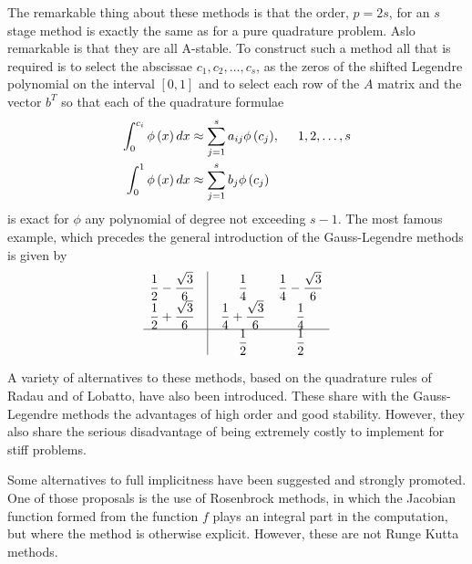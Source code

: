 \documentclass[a4paper,oneside]{book}
\numberwithin{equation}{chapter}
\begin{document}
The remarkable thing about these methods is that the order, $p=2s$, for an $s$ stage method is exactly the same as for a pure quadrature problem. Aslo remarkable is that they are all A-stable. To construct such a method all that is required is to select the abscissae $c_1,c_2,\ldots,c_s$, as the zeros of the shifted Legendre polynomial on the interval $\left[ 0,1\right]$ and to select each row of the $A$ matrix and the vector $b^T$ so that each of the quadrature formulae
\begin{align}
\int_0^{{c_i}} {\phi \left( x \right)dx}  &\approx \sum\limits_{j = 1}^s {{a_{ij}}\phi \left( {{c_j}} \right)} ,\hspace{0.5cm}  1,2, \ldots ,s\\
\int_0^1 {\phi \left( x \right)dx}  &\approx \sum\limits_{j = 1}^s {{b_j}\phi \left( {{c_j}} \right)} 
\end{align}
is exact for $\phi$ any polynomial of degree not exceeding $s-1$. The most famous example, which precedes the general introduction of the Gauss-Legendre methods is given by
\begin{align}
\begin{array}{*{20}{c}}
{\dfrac{1}{2} - \dfrac{{\sqrt 3 }}{6}}&\vline& {\dfrac{1}{4}}&{\dfrac{1}{4} - \dfrac{{\sqrt 3 }}{6}}\\
{\dfrac{1}{2} + \dfrac{{\sqrt 3 }}{6}}&\vline& {\dfrac{1}{4} + \dfrac{{\sqrt 3 }}{6}}&{\dfrac{1}{4}}\\
\hline
{}&\vline& {\dfrac{1}{2}}&{\dfrac{1}{2}}
\end{array}
\end{align}

A variety of alternatives to these methods, based on the quadrature rules of Radau and of Lobatto, have also been introduced. These share with the Gauss-Legendre methods the advantages of high order and good stability. However, they also share the serious disadvantage of being extremely costly to implement for stiff problems.

Some alternatives to full implicitness have been suggested and strongly promoted. One of those proposals is the use of Rosenbrock methods, in which the Jacobian function formed from the function $f$ plays an integral part in the computation, but where the method is otherwise explicit. However, these are not Runge Kutta methods.
\end{document}
